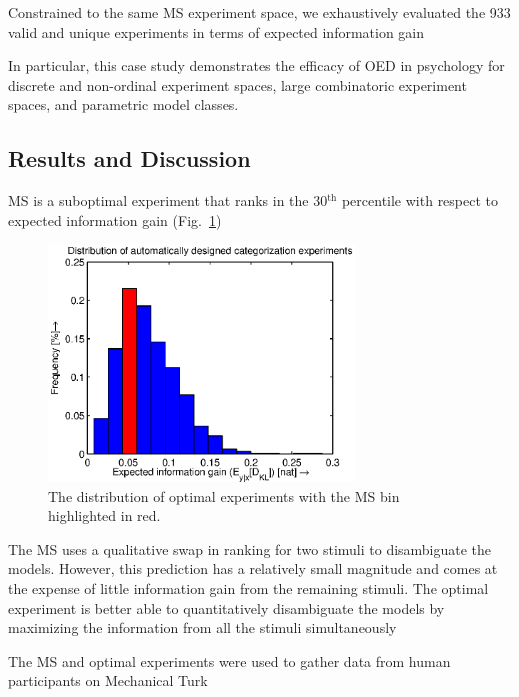 \documentclass[11pt]{article}
\begin{document}
Constrained to the same MS experiment space, we exhaustively evaluated the 933 valid and unique experiments in terms of expected information gain

In particular, this case study demonstrates the efficacy of OED in psychology for discrete and non-ordinal experiment spaces, large combinatoric experiment spaces, and parametric model classes. 

\subsection{Results and Discussion}

MS is a suboptimal experiment that ranks in the 30$^\text{th}$ percentile with respect to expected information gain (Fig.~\ref{fig:dist})
\begin{figure}[h!]
\centering
\includegraphics[width=3.2in]{img/dist.eps}
\caption{The distribution of optimal experiments with the MS bin highlighted in red.}
\label{fig:dist}
\end{figure}

The MS uses a qualitative swap in ranking for two stimuli to disambiguate the models. However, this prediction has a relatively small magnitude and comes at the expense of little information gain from the remaining stimuli. The optimal experiment is better able to quantitatively disambiguate the models by maximizing the information from all the stimuli simultaneously

The MS and optimal experiments were used to gather data from human participants on Mechanical Turk
\end{document}
